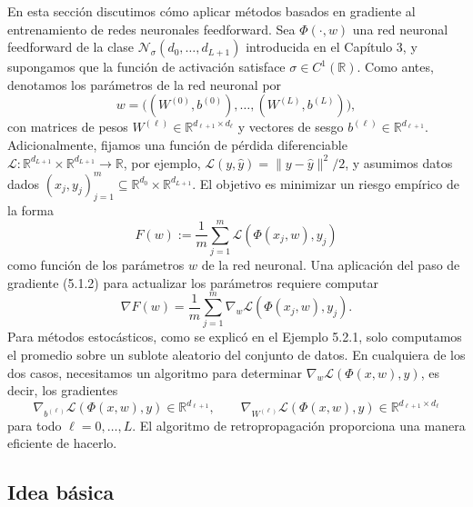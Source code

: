 \documentclass[11pt]{report}
\theoremstyle{definition}
\theoremstyle{plain}
\numberwithin{equation}{section}
\begin{document}
En esta sección discutimos cómo aplicar métodos basados en gradiente al entrenamiento de redes neuronales feedforward. Sea \(\Phi(\cdot,w)\) una red neuronal feedforward de la clase \(\mathcal{N}_\sigma(d_0,\ldots,d_{L+1})\) introducida en el Capítulo 3, y supongamos que la función de activación satisface \(\sigma\in C^1(\mathbb{R})\). Como antes, denotamos los parámetros de la red neuronal por
\begin{equation*}
    w=
    \bigl((W^{(0)},b^{(0)}),\ldots,(W^{(L)},b^{(L)})\bigr),
    \tag{5.4.1}
\end{equation*}
con matrices de pesos \(W^{(\ell)}\in\mathbb{R}^{d_{\ell+1}\times d_\ell}\) y vectores de sesgo \(b^{(\ell)}\in\mathbb{R}^{d_{\ell+1}}\). Adicionalmente, fijamos una función de pérdida diferenciable \(\mathcal{L}:\mathbb{R}^{d_{L+1}}\times\mathbb{R}^{d_{L+1}}\to\mathbb{R}\), por ejemplo, \(\mathcal{L}(y,\widehat{y})=\|y-\widehat{y}\|^2/2\), y asumimos datos dados \((x_j,y_j)_{j=1}^{m}\subseteq\mathbb{R}^{d_0}\times\mathbb{R}^{d_{L+1}}\). El objetivo es minimizar un riesgo empírico de la forma
\begin{equation*}
    F(w)
    :=
    \frac{1}{m}
    \sum_{j=1}^{m}
    \mathcal{L}(\Phi(x_j,w),y_j)
    \tag{5.4.2}
\end{equation*}
como función de los parámetros \(w\) de la red neuronal. Una aplicación del paso de gradiente (5.1.2) para actualizar los parámetros requiere computar
\begin{equation*}
    \nabla F(w)
    =
    \frac{1}{m}
    \sum_{j=1}^{m}
    \nabla_w\mathcal{L}(\Phi(x_j,w),y_j).
\end{equation*}
Para métodos estocásticos, como se explicó en el Ejemplo 5.2.1, solo computamos el promedio sobre un sublote aleatorio del conjunto de datos. En cualquiera de los dos casos, necesitamos un algoritmo para determinar \(\nabla_w\mathcal{L}(\Phi(x,w),y)\), es decir, los gradientes
\begin{equation*}
    \nabla_{b^{(\ell)}}\mathcal{L}(\Phi(x,w),y)\in\mathbb{R}^{d_{\ell+1}},
    \qquad
    \nabla_{W^{(\ell)}}\mathcal{L}(\Phi(x,w),y)\in\mathbb{R}^{d_{\ell+1}\times d_\ell}
    \tag{5.4.3}
\end{equation*}
para todo \(\ell=0,\ldots,L\). El algoritmo de retropropagación \cite{rumelhart-hinton-williams-1986} proporciona una manera eficiente de hacerlo.

\subsection{Idea básica}
\end{document}
